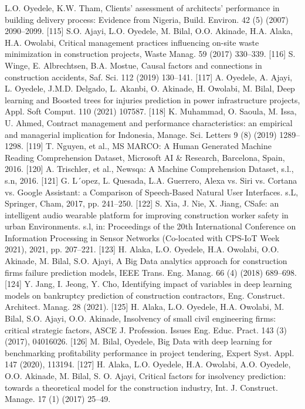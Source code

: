 \documentclass[towcolumn, 11pt]{Article}
\begin{document}
\begin{چکیده}
[114] L.O. Oyedele, K.W. Tham, Clients’ assessment of architects’ performance in building delivery process: Evidence from Nigeria, Build. Environ. 42 (5) (2007) 2090–2099. 
[115] S.O. Ajayi, L.O. Oyedele, M. Bilal, O.O. Akinade, H.A. Alaka, H.A. Owolabi, Critical management practices influencing on-site waste minimization in construction projects, Waste Manag. 59 (2017) 330–339. 
[116] S. Winge, E. Albrechtsen, B.A. Mostue, Causal factors and connections in construction accidents, Saf. Sci. 112 (2019) 130–141. 
[117] A. Oyedele, A. Ajayi, L. Oyedele, J.M.D. Delgado, L. Akanbi, O. Akinade, H. Owolabi, M. Bilal, Deep learning and Boosted trees for injuries prediction in power infrastructure projects, Appl. Soft Comput. 110 (2021) 107587. 
[118] K. Muhammad, O. Saoula, M. Issa, U. Ahmed, Contract management and performance characteristics: an empirical and managerial implication for Indonesia, Manage. Sci. Letters 9 (8) (2019) 1289–1298. 
[119] T. Nguyen, et al., MS MARCO: A Human Generated Machine Reading Comprehension Dataset, Microsoft AI & Research, Barcelona, Spain, 2016. 
[120] A. Trischler, et al., Newsqa: A Machine Comprehension Dataset, s.l., s.n, 2016. 
[121] G. L´opez, L. Quesada, L.A. Guerrero, Alexa vs. Siri vs. Cortana vs. Google Assistant: a Comparison of Speech-Based Natural User Interfaces. s.L, Springer, Cham, 2017, pp. 241–250. 
[122] S. Xia, J. Nie, X. Jiang, CSafe: an intelligent audio wearable platform for improving construction worker safety in urban Environments. s.l, in: Proceedings of the 20th International Conference on Information Processing in Sensor Networks (Co-located with CPS-IoT Week 2021), 2021, pp. 207–221. 
[123] H. Alaka, L.O. Oyedele, H.A. Owolabi, O.O. Akinade, M. Bilal, S.O. Ajayi, A Big Data analytics approach for construction firms failure prediction models, IEEE Trans. Eng. Manag. 66 (4) (2018) 689–698. 
[124] Y. Jang, I. Jeong, Y. Cho, Identifying impact of variables in deep learning models on bankruptcy prediction of construction contractors, Eng. Construct. Architect. Manag. 28 (2021). 
[125] H. Alaka, L.O. Oyedele, H.A. Owolabi, M. Bilal, S.O. Ajayi, O.O. Akinade, Insolvency of small civil engineering firms: critical strategic factors, ASCE J. Profession. Issues Eng. Educ. Pract. 143 (3) (2017), 04016026. 
[126] M. Bilal, Oyedele, Big Data with deep learning for benchmarking profitability performance in project tendering, Expert Syst. Appl. 147 (2020), 113194. 
[127] H. Alaka, L.O. Oyedele, H.A. Owolabi, A.O. Oyedele, O.O. Akinade, M. Bilal, S. O. Ajayi, Critical factors for insolvency prediction: towards a theoretical model for the construction industry, Int. J. Construct. Manage. 17 (1) (2017) 25–49. 

\end{چکیده}
\end{document}
